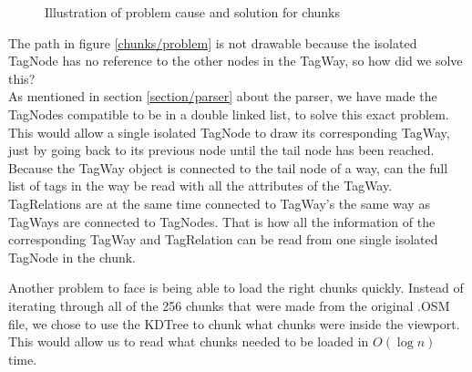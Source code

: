 \begin{figure}[ht]%
  \centering
  \hspace{2cm}
  \caption{Illustration of problem cause and solution for chunks }\label{kbhBench}
\end{figure}
The path in figure \ref{chunks/problem} is not drawable because the isolated TagNode has no reference to the other nodes in the TagWay, so how did we solve this?
\\
As mentioned in section \ref{section/parser} about the parser, we have made the TagNodes compatible to be in a double linked list, to solve this exact problem. This would allow a single isolated TagNode to draw its corresponding TagWay, just by going back to its previous node until the tail node has been reached. Because the TagWay object is connected to the tail node of a way, can the full list of tags in the way be read with all the attributes of the TagWay.  TagRelations are at the same time connected to TagWay’s the same way as TagWays are connected to TagNodes. That is how all the information of the corresponding TagWay and TagRelation can be read from one single isolated TagNode in the chunk.
\par
Another problem to face is being able to load the right chunks quickly. Instead of iterating through all of the 256 chunks that were made from the original .OSM file, we chose to use the KDTree to chunk what chunks were inside the viewport. This would allow us to read what chunks needed to be loaded in $O(\log n)$ time.
